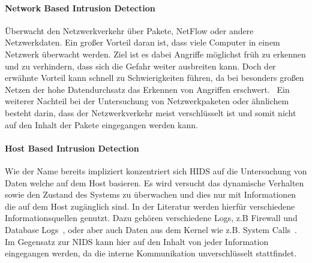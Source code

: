             \paragraph{Network Based Intrusion Detection}
                Überwacht den Netzwerkverkehr über Pakete, NetFlow oder andere Netzwerkdaten.
                Ein großer Vorteil daran ist, dass viele Computer in einem Netzwerk überwacht werden.
                Ziel ist es dabei Angriffe möglichst früh zu erkennen und zu verhindern,
                dass sich die Gefahr weiter ausbreiten kann.
                Doch der erwähnte Vorteil kann schnell zu Schwierigkeiten führen,
                da bei besonders großen Netzen der hohe Datendurchsatz das Erkennen von Angriffen erschwert.~\cite{NIDS}
                Ein weiterer Nachteil bei der Untersuchung von Netzwerkpaketen oder ähnlichem besteht darin,
                dass der Netzwerkverkehr meist verschlüsselt ist
                und somit nicht auf den Inhalt der Pakete eingegangen werden kann.

            \paragraph{Host Based Intrusion Detection}
                Wie der Name bereits impliziert konzentriert sich HIDS auf die Untersuchung 
                von Daten welche auf dem Host basieren.
                Es wird versucht das dynamische Verhalten sowie den Zustand des Systems zu überwachen 
                und dies nur mit Informationen die auf dem Host zugänglich sind.
                In der Literatur werden hierfür verschiedene Informationsquellen genutzt.
                Dazu gehören verschiedene Logs, z.B Firewall und Database Logs~\cite{IDSsurvey},
                oder aber auch Daten aus dem Kernel wie z.B. System Calls~\cite{MAGGI}.
                Im Gegensatz zur NIDS kann hier auf den Inhalt von jeder Information eingegangen werden,
                da die interne Kommunikation unverschlüsselt stattfindet. 

